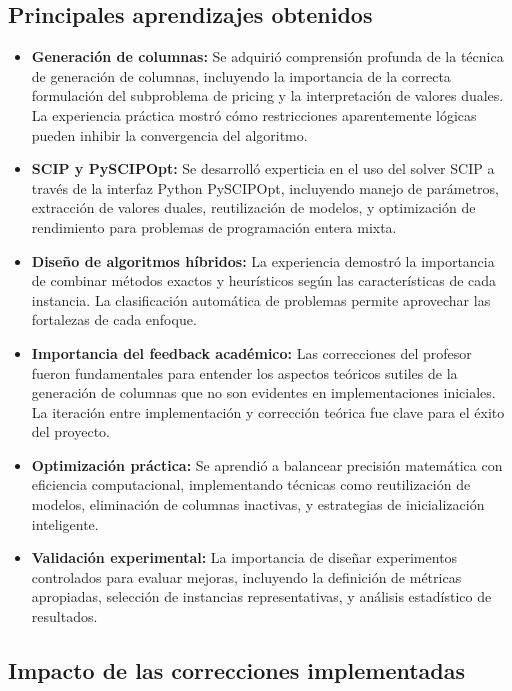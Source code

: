 \documentclass[a4paper,12pt]{article}
\begin{document}
\subsection*{Principales aprendizajes obtenidos}

\begin{itemize}
    \item \textbf{Generación de columnas:} Se adquirió comprensión profunda de la técnica de generación de columnas, incluyendo la importancia de la correcta formulación del subproblema de pricing y la interpretación de valores duales. La experiencia práctica mostró cómo restricciones aparentemente lógicas pueden inhibir la convergencia del algoritmo.

    \item \textbf{SCIP y PySCIPOpt:} Se desarrolló experticia en el uso del solver SCIP a través de la interfaz Python PySCIPOpt, incluyendo manejo de parámetros, extracción de valores duales, reutilización de modelos, y optimización de rendimiento para problemas de programación entera mixta.

    \item \textbf{Diseño de algoritmos híbridos:} La experiencia demostró la importancia de combinar métodos exactos y heurísticos según las características de cada instancia. La clasificación automática de problemas permite aprovechar las fortalezas de cada enfoque.

    \item \textbf{Importancia del feedback académico:} Las correcciones del profesor fueron fundamentales para entender los aspectos teóricos sutiles de la generación de columnas que no son evidentes en implementaciones iniciales. La iteración entre implementación y corrección teórica fue clave para el éxito del proyecto.

    \item \textbf{Optimización práctica:} Se aprendió a balancear precisión matemática con eficiencia computacional, implementando técnicas como reutilización de modelos, eliminación de columnas inactivas, y estrategias de inicialización inteligente.

    \item \textbf{Validación experimental:} La importancia de diseñar experimentos controlados para evaluar mejoras, incluyendo la definición de métricas apropiadas, selección de instancias representativas, y análisis estadístico de resultados.
\end{itemize}

\subsection*{Impacto de las correcciones implementadas}
\end{document}
